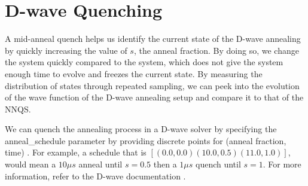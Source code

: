 \chapter{D-wave Quenching}\label{appendix:quenching}
A mid-anneal quench helps us identify the current state of the D-wave annealing by quickly increasing the value of $s$, the anneal fraction. By doing so, we change the system quickly compared to the system, which does not give the system enough time to evolve and freezes the current state. By measuring the distribution of states through repeated sampling, we can peek into the evolution of the wave function of the D-wave annealing setup and compare it to that of the NNQS.

We can quench the annealing process in a D-wave solver by specifying the anneal\_schedule parameter by providing discrete points for (anneal fraction, time) \cite{dwaveadvantage}. For example, a schedule that is $[(0.0,0.0)(10.0,0.5)(11.0,1.0)]$, would mean a $10 \mu s$ anneal until $s=0.5$ then a $1 \mu s$ quench until $s=1$. For more information, refer to the D-wave documentation \cite{dwavequench}.